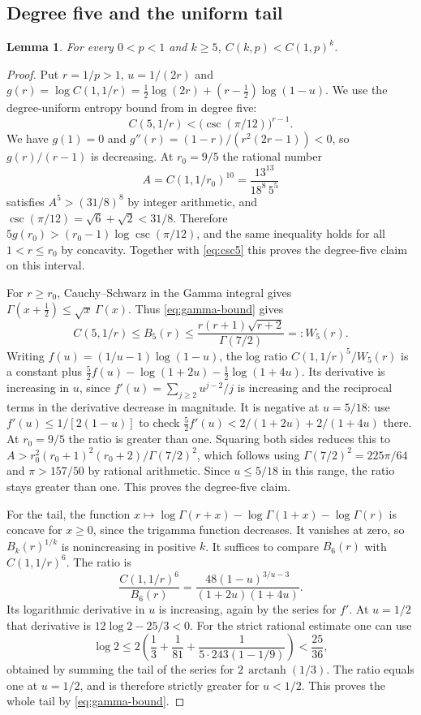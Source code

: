 \documentclass[11pt]{article}
\newtheorem{lemma}[theorem]{Lemma}
\begin{document}
\subsection{Degree five and the uniform tail}

\begin{lemma}\label{lem:tail-domination}
For every \(0<p<1\) and \(k\ge5\), \(C(k,p)<C(1,p)^k\).
\end{lemma}

\begin{proof}
Put \(r=1/p>1\), \(u=1/(2r)\) and
\(g(r)=\log C(1,1/r)=\tfrac12\log(2r)+(r-\tfrac12)\log(1-u)\).
We use the degree-uniform entropy bound from \cite{General}
in degree five:
\begin{equation}\label{eq:csc5}
 C(5,1/r)<\bigl(\csc(\pi/12)\bigr)^{r-1}.
\end{equation}
We have \(g(1)=0\) and \(g''(r)=(1-r)/(r^2(2r-1))<0\),
so \(g(r)/(r-1)\) is decreasing. At \(r_0=9/5\) the
rational number
\[
 A=C(1,1/r_0)^{10}=\frac{13^{13}}{18^8\,5^5}
\]
satisfies \(A^5>(31/8)^8\) by integer arithmetic, and
\(\csc(\pi/12)=\sqrt6+\sqrt2<31/8\). Therefore
\(5g(r_0)>(r_0-1)\log\csc(\pi/12)\), and the same
inequality holds for all \(1<r\le r_0\) by concavity.
Together with \eqref{eq:csc5} this proves the degree-five
claim on this interval.

For \(r\ge r_0\), Cauchy--Schwarz in the Gamma integral
gives \(\Gamma(x+\tfrac12)\le\sqrt{x}\,\Gamma(x)\).
Thus \eqref{eq:gamma-bound} gives
\[
 C(5,1/r)\le B_5(r)\le
 \frac{r(r+1)\sqrt{r+2}}{\Gamma(7/2)}=:W_5(r).
\]
Writing \(f(u)=(1/u-1)\log(1-u)\), the log ratio
\(C(1,1/r)^5/W_5(r)\) is a constant plus
\(\tfrac52 f(u)-\log(1+2u)-\tfrac12\log(1+4u)\).
Its derivative is increasing in \(u\), since
\(f'(u)=\sum_{j\ge2}u^{j-2}/j\) is increasing
and the reciprocal terms in the derivative decrease in
magnitude. It is negative at \(u=5/18\): use
\(f'(u)\le1/[2(1-u)]\) to check
\(\tfrac52 f'(u)<2/(1+2u)+2/(1+4u)\) there.
At \(r_0=9/5\) the ratio is greater than one. Squaring both sides
reduces this to
\(A>r_0^2(r_0+1)^2(r_0+2)/\Gamma(7/2)^2\), which follows
using \(\Gamma(7/2)^2=225\pi/64\) and \(\pi>157/50\)
by rational arithmetic. Since \(u\le5/18\) in this range,
the ratio stays greater than one. This proves the
degree-five claim.

For the tail, the function
\(x\mapsto\log\Gamma(r+x)-\log\Gamma(1+x)-\log\Gamma(r)\)
is concave for \(x\ge0\), since the trigamma function decreases.
It vanishes at zero, so \(B_k(r)^{1/k}\) is nonincreasing
in positive \(k\). It suffices to compare \(B_6(r)\) with
\(C(1,1/r)^6\). The ratio is
\[
 \frac{C(1,1/r)^6}{B_6(r)}
   =\frac{48(1-u)^{3/u-3}}{(1+2u)(1+4u)}.
\]
Its logarithmic derivative in \(u\) is increasing, again by
the series for \(f'\). At \(u=1/2\) that derivative is
\(12\log2-25/3<0\). For the strict rational estimate one
can use
\[
 \log2
 \le 2\left(\frac13+\frac1{81}
               +\frac{1}{5\cdot243(1-1/9)}\right)<\frac{25}{36},
\]
obtained by summing the tail of the series for
\(2\,\operatorname{arctanh}(1/3)\).
The ratio equals one at \(u=1/2\), and is therefore strictly
greater for \(u<1/2\). This proves the whole tail by
\eqref{eq:gamma-bound}.
\end{proof}
\end{document}
